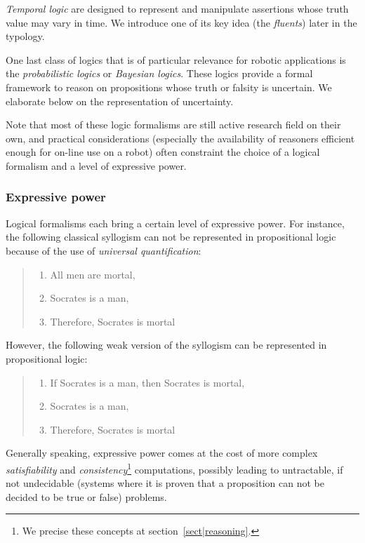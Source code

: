 \emph{Temporal logic} are designed to represent and manipulate assertions whose
truth value may vary in time. We introduce one of its key idea (the
\emph{fluents}) later in the typology.

One last class of logics that is of particular relevance for robotic
applications is the \emph{probabilistic logics} or \emph{Bayesian logics}.
These logics provide a formal framework to reason on propositions whose truth
or falsity is uncertain. We elaborate below on the representation of uncertainty.

Note that most of these logic formalisms are still active research field on
their own, and practical considerations (especially the availability of
reasoners efficient enough for on-line use on a robot) often constraint the
choice of a logical formalism and a level of expressive power.

\subsubsection{Expressive power}

Logical formalisms each bring a certain level of expressive power. For
instance, the following classical syllogism can not be represented in
propositional logic because of the use of \emph{universal quantification}:

\begin{quote}
\begin{enumerate}
    \item All men are mortal,
    \item Socrates is a man,
    \item Therefore, Socrates is mortal
\end{enumerate}
\end{quote}

However, the following weak version of the syllogism can be represented in
propositional logic:

\begin{quote}
\begin{enumerate}
    \item If Socrates is a man, then Socrates is mortal,
    \item Socrates is a man,
    \item Therefore, Socrates is mortal
\end{enumerate}
\end{quote}

Generally speaking, expressive power comes at the cost of more complex
\emph{satisfiability} and \emph{consistency}\footnote{We precise these concepts
at section~\ref{sect|reasoning}.} computations, possibly leading to
untractable, if not undecidable (\ie systems where it is proven that a
proposition can not be decided to be true or false) problems.

